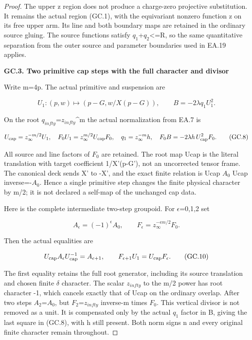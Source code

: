 \begin{proof}
The upper z region does not produce a charge-zero projective
substitution. It remains the actual region (GC.1), with the
equivariant nonzero function z on its free upper arm. Its line
and both boundary maps are retained in the ordinary source
gluing. The source functions satisfy
\textbar{}\(q_1\)\textbar+\textbar{}\(q_2\)\textbar\textless=R, so the same quantitative separation from the
outer source and parameter boundaries used in EA.19 applies.

\par

\medskip\noindent\textbf{GC.3. Two primitive cap steps with the full character and divisor}

\par\nobreak

Write m=4p. The actual primitive and suspension are

\[
 U_1:(p,w)\longmapsto(p-G,w/X(p-G)),\qquad
 B=-2\lambda q_1 U_1^2.                            \tag{GC.7}
\]

On the root \(q_{infty}\)=\(z_{infty}\)\^{}m the actual normalization from
EA.7 is

\[
 U_{\rm cap}=z_\infty^{-m/2}U_1,\quad
 F_0U_1=z_\infty^{m/2}U_{\rm cap}F_0,\quad
 q_1=z_\infty^{-m}h,\quad
 F_0B=-2\lambda h\,U_{\rm cap}^2F_0.              \tag{GC.8}
\]

All source and line factors of \(F_0\) are retained. The root map
Ucap is the literal translation with target coefficient
1/X'(p-G'), not an uncorrected tensor frame. The canonical
deck sends X' to -X', and the exact finite relation is
Ucap \(A_0\) Ucap inverse=-\(A_0\). Hence a single primitive step changes
the finite physical character by m/2; it is not declared a
self-map of the unchanged cap data.

Here is the complete intermediate two-step groupoid. For
\(\epsilon\)=0,1,2 set

\[
 A_\epsilon=(-1)^\epsilon A_0,\qquad
 F_\epsilon=z_\infty^{-\epsilon m/2}F_0.
 \tag{GC.9}
\]

Then the actual equalities are

\[
 U_{\rm cap} A_\epsilon U_{\rm cap}^{-1}
       =A_{\epsilon+1},\qquad
 F_{\epsilon+1}U_1=U_{\rm cap}F_\epsilon.
 \tag{GC.10}
\]

The first equality retains the full root generator, including
its source translation and chosen finite \(\delta\) character.
The scalar \(z_{infty}\) to the m/2 power has root character -1,
which cancels exactly that of Ucap on the ordinary overlap.
After two steps \(A_2\)=\(A_0\), but \(F_2\)=\(z_{infty}\) inverse-m times \(F_0\).
This vertical divisor is not removed as a unit. It is
compensated only by the actual \(q_1\) factor in B, giving the last
square in (GC.8), with h still present. Both norm signs n and
every original finite character remain throughout.


\end{proof}
